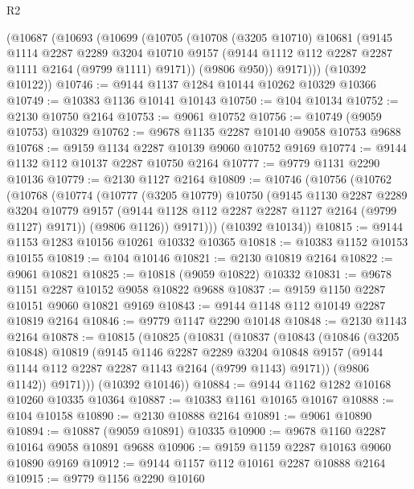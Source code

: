\begin{lexlean}{R2}
\begin{coremodule}
    (@10687
      (@10693
        (@10699
          (@10705
            (@10708
              (@3205 @10710)
              @10681
              (@9145
                @1114
                @2287
                @2289
                @3204
                @10710
                @9157
                (@9144 @1112 @112 @2287 @2287 @1111 @2164 (@9799 @1111) @9171))
              (@9806 @950))
            @9171)))
      (@10392 @10122))
@10746 := @9144 @1137 @1284 @10144 @10262 @10329 @10366
@10749 := @10383 @1136 @10141 @10143
@10750 := @104 @10134
@10752 := @2130 @10750 @2164
@10753 := @9061 @10752
@10756 := @10749 (@9059 @10753) @10329
@10762 := @9678 @1135 @2287 @10140 @9058 @10753 @9688
@10768 := @9159 @1134 @2287 @10139 @9060 @10752 @9169
@10774 := @9144 @1132 @112 @10137 @2287 @10750 @2164
@10777 := @9779 @1131 @2290 @10136
@10779 := @2130 @1127 @2164
@10809 := @10746
    (@10756
      (@10762
        (@10768
          (@10774
            (@10777
              (@3205 @10779)
              @10750
              (@9145
                @1130
                @2287
                @2289
                @3204
                @10779
                @9157
                (@9144 @1128 @112 @2287 @2287 @1127 @2164 (@9799 @1127) @9171))
              (@9806 @1126))
            @9171)))
      (@10392 @10134))
@10815 := @9144 @1153 @1283 @10156 @10261 @10332 @10365
@10818 := @10383 @1152 @10153 @10155
@10819 := @104 @10146
@10821 := @2130 @10819 @2164
@10822 := @9061 @10821
@10825 := @10818 (@9059 @10822) @10332
@10831 := @9678 @1151 @2287 @10152 @9058 @10822 @9688
@10837 := @9159 @1150 @2287 @10151 @9060 @10821 @9169
@10843 := @9144 @1148 @112 @10149 @2287 @10819 @2164
@10846 := @9779 @1147 @2290 @10148
@10848 := @2130 @1143 @2164
@10878 := @10815
    (@10825
      (@10831
        (@10837
          (@10843
            (@10846
              (@3205 @10848)
              @10819
              (@9145
                @1146
                @2287
                @2289
                @3204
                @10848
                @9157
                (@9144 @1144 @112 @2287 @2287 @1143 @2164 (@9799 @1143) @9171))
              (@9806 @1142))
            @9171)))
      (@10392 @10146))
@10884 := @9144 @1162 @1282 @10168 @10260 @10335 @10364
@10887 := @10383 @1161 @10165 @10167
@10888 := @104 @10158
@10890 := @2130 @10888 @2164
@10891 := @9061 @10890
@10894 := @10887 (@9059 @10891) @10335
@10900 := @9678 @1160 @2287 @10164 @9058 @10891 @9688
@10906 := @9159 @1159 @2287 @10163 @9060 @10890 @9169
@10912 := @9144 @1157 @112 @10161 @2287 @10888 @2164
@10915 := @9779 @1156 @2290 @10160

\end{coremodule}
\end{lexlean}
